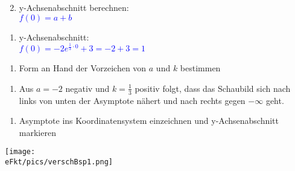 \begin{minipage}{\textwidth}
	\begin{minipage}[t]{0.49\textwidth}
		\begin{enumerate}[label=\arabic*), leftmargin=*, rightmargin=0.5cm]
			\setcounter{enumi}{1}
			\item y-Achsenabschnitt berechnen:\\
			\textcolor{blue}{\(f(0)=a+b\)}
		\end{enumerate}
	\end{minipage}
	\begin{minipage}[t]{0.49\textwidth}
		\begin{enumerate}[label={}, leftmargin=*]
			\item y-Achsenabschnitt:\\
			\textcolor{blue}{\(f(0)=-2e^{\frac{1}{3}\cdot 0}+3=-2+3=1\)}
		\end{enumerate}
	\end{minipage}
\end{minipage}\vspace{0.2cm}
\begin{minipage}{\textwidth}
	\begin{minipage}[t]{0.49\textwidth}
		\begin{enumerate}[label=\arabic*), leftmargin=*, rightmargin=0.5cm]\raggedright
			\setcounter{enumi}{2}
			\item Form an Hand der Vorzeichen von \(a\) und \(k\) bestimmen
		\end{enumerate}
	\end{minipage}
	\begin{minipage}[t]{0.49\textwidth}
		\begin{enumerate}[label={}, leftmargin=*]
			\item Aus \(a=-2\) negativ und \(k=\frac{1}{3}\) positiv folgt, dass das Schaubild sich nach links von unten der Asymptote nähert und nach rechts gegen \(-\infty\) geht.
		\end{enumerate}
	\end{minipage}
\end{minipage}
\begin{minipage}{\textwidth}
	\begin{minipage}{0.49\textwidth}
		\begin{enumerate}[label=\arabic*), leftmargin=*, rightmargin=0.5cm]\raggedright
			\setcounter{enumi}{3}
			\item Asymptote ins Koordinatensystem einzeichnen und y-Achsenabschnitt markieren
		\end{enumerate}
	\end{minipage}
	\begin{minipage}{0.49\textwidth}
		\begin{minipage}[t]{0.95\textwidth}
			\texttt{[image: \\eFkt/pics/verschBsp1.png]}
		\end{minipage}\\
	\end{minipage}
\end{minipage}
